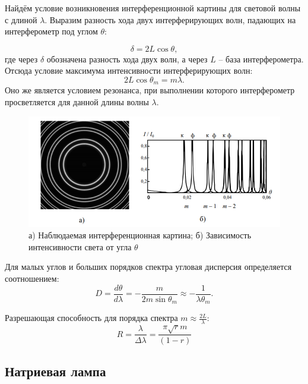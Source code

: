 \documentclass[a4paper, 12pt]{article}%
\begin{document}
Найдём условие возникновения интерференционной картины для световой волны с длиной $ \lambda $. Выразим разность хода двух интерферирующих волн, падающих на интерферометр под углом $ \theta $:

\begin{equation*}\label{key}
	\delta = 2 L \cos \theta,
\end{equation*}
где через $ \delta $ обозначена разность хода двух волн, а через $ L $ -- база интерферометра. Отсюда условие максимума интенсивности интерферирующих волн:
\begin{equation*}\label{key}
	2 L \cos \theta_m = m \lambda.
\end{equation*}
Оно же является условием резонанса, при выполнении которого интерферометр просветляется для данной длины волны $ \lambda $.

		\begin{figure}[h!]
		\centering
		\includegraphics[width=0.7\linewidth]{Screenshot_2.png}
		\caption{а) Наблюдаемая интерференционная картина; б) Зависимость интенсивности света от угла $ \theta $}
		\label{fig:screenshot2}
	\end{figure}

Для малых углов и больших порядков спектра угловая дисперсия определяется соотношением:
\begin{equation*}\label{key}
	D = \frac{d \theta}{d \lambda} = - \frac{m}{2 m \sin \theta_m} \approx - \frac{1}{\lambda \theta_m}.
\end{equation*}

Разрешающая способность для порядка спектра $ m \approx \frac{2 L}{\lambda} $:
\begin{equation*}\label{key}
	R = \frac{\lambda}{\Delta \lambda}= \frac{\pi\sqrt{r} m }{(1-r)}
\end{equation*}





	\subsection{Натриевая лампа}
\end{document}
